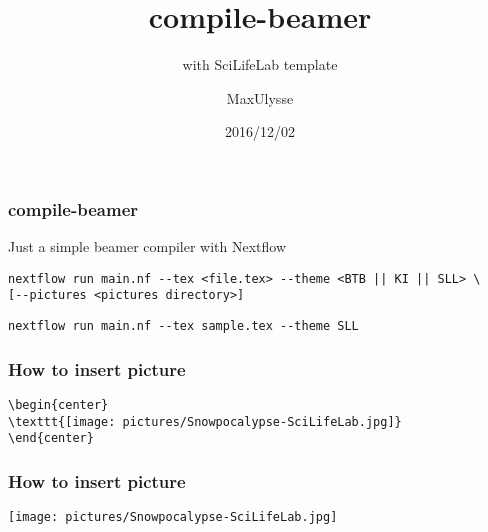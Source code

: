 \documentclass{beamer}
\title{compile-beamer}
\subtitle{with SciLifeLab template}
\author{MaxUlysse}
\institute{Barntumörbanken / SciLifeLab}
\date{2016/12/02}
\begin{document}
\begin{frame}
	\titlepage
\end{frame}

\begin{frame}[fragile]
\frametitle{compile-beamer}
Just a simple beamer compiler with Nextflow
\begin{lstlisting}[title=Usage]
nextflow run main.nf --tex <file.tex> --theme <BTB || KI || SLL> \
[--pictures <pictures directory>]
\end{lstlisting}
\begin{lstlisting}[title=This file was made using]
nextflow run main.nf --tex sample.tex --theme SLL
\end{lstlisting}
\end{frame}

\begin{frame}[fragile]
\frametitle{How to insert picture}
\begin{lstlisting}[title=Code]
\begin{center}
\texttt{[image: pictures/Snowpocalypse-SciLifeLab.jpg]}
\end{center}
\end{lstlisting}
\end{frame}

\begin{frame}
	\frametitle{How to insert picture}
	\begin{center}
		\texttt{[image: pictures/Snowpocalypse-SciLifeLab.jpg]}
	\end{center}
\end{frame}
\end{document}
